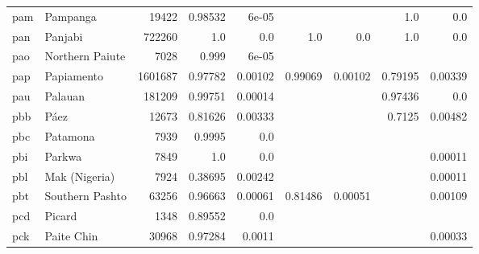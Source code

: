 \documentclass[11pt]{article}
\begin{document}
\begin{table*}[h]
{\begin{tabular}{llrrrrrrr}
pam         & Pampanga         & 19422         & 0.98532         & 6e-05         &          &          & 1.0         & 0.0         \\

pan         & Panjabi         & 722260         & 1.0         & 0.0         & 1.0         & 0.0         & 1.0         & 0.0         \\

pao         & Northern Paiute         & 7028         & 0.999         & 6e-05         &          &          &          &          \\

pap         & Papiamento         & 1601687         & 0.97782         & 0.00102         & 0.99069         & 0.00102         & 0.79195         & 0.00339         \\

pau         & Palauan         & 181209         & 0.99751         & 0.00014         &          &          & 0.97436         & 0.0         \\

pbb         & Páez         & 12673         & 0.81626         & 0.00333         &          &          & 0.7125         & 0.00482         \\

pbc         & Patamona         & 7939         & 0.9995         & 0.0         &          &          &          &          \\

pbi         & Parkwa         & 7849         & 1.0         & 0.0         &          &          &          & 0.00011         \\

pbl         & Mak (Nigeria)         & 7924         & 0.38695         & 0.00242         &          &          &          & 0.00011         \\

pbt         & Southern Pashto         & 63256         & 0.96663         & 0.00061         & 0.81486         & 0.00051         &          & 0.00109         \\

pcd         & Picard         & 1348         & 0.89552         & 0.0         &          &          &          &          \\

pck         & Paite Chin         & 30968         & 0.97284         & 0.0011         &          &          &          & 0.00033         \\


\end{tabular}}
\end{table*}
\end{document}
